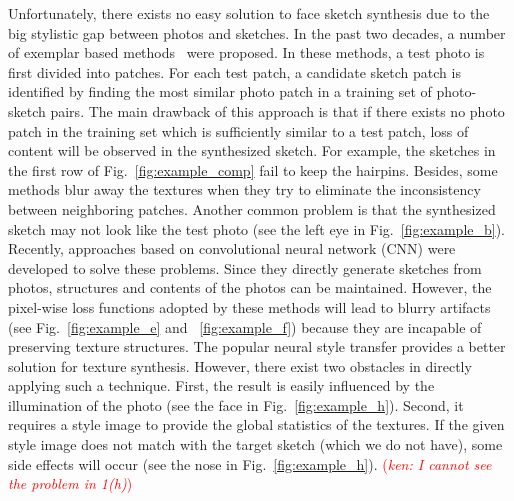 \documentclass[10pt,twocolumn,letterpaper]{article}
\newcommand\ken[1]{{\small \textcolor{red}{(\emph{ken: #1})}}}
\begin{document}
Unfortunately, there exists no easy solution to face sketch synthesis due to the big stylistic gap between photos and sketches. In the past two decades, a number of exemplar based methods~\cite{wang2009face,song2014real, zhang2010lighting,zhou2012markov} were proposed. In these methods, a test photo is first divided into patches. For each test patch, a candidate sketch patch is identified by finding the most similar photo patch in a training set of photo-sketch pairs. The main drawback of this approach is that if there exists no photo patch in the training set which is  sufficiently similar to a test patch, loss of content will be observed in the synthesized sketch. For example, the sketches in the first row of Fig.~\ref{fig:example_comp} fail to keep the hairpins. Besides, some methods \cite{song2014real,zhou2012markov} blur away the textures when they try to eliminate the inconsistency between neighboring patches. Another common problem is that the synthesized sketch may not look like the test photo (see the left eye in Fig.~\ref{fig:example_b}). Recently, approaches \cite{zhang2017content,zhang2015end} based on convolutional neural network (CNN) were developed to solve these problems. Since they directly generate sketches from photos, structures and contents of the photos can be maintained. However, the pixel-wise loss functions adopted by these methods will lead to blurry artifacts (see Fig.~\ref{fig:example_e} and ~\ref{fig:example_f}) because they are incapable of preserving texture structures. The popular neural style transfer provides a better solution for texture synthesis. However, there exist two obstacles in directly applying such a technique. First, the result is easily influenced by the illumination of the photo (see the face in Fig.~\ref{fig:example_h}). Second, it requires a style image to provide the global statistics of the textures. If the given style image does not match with the target sketch (which we do not have), some side effects will occur (see the nose in Fig.~\ref{fig:example_h}). \ken{I cannot see the problem in 1(h)} %
\end{document}
